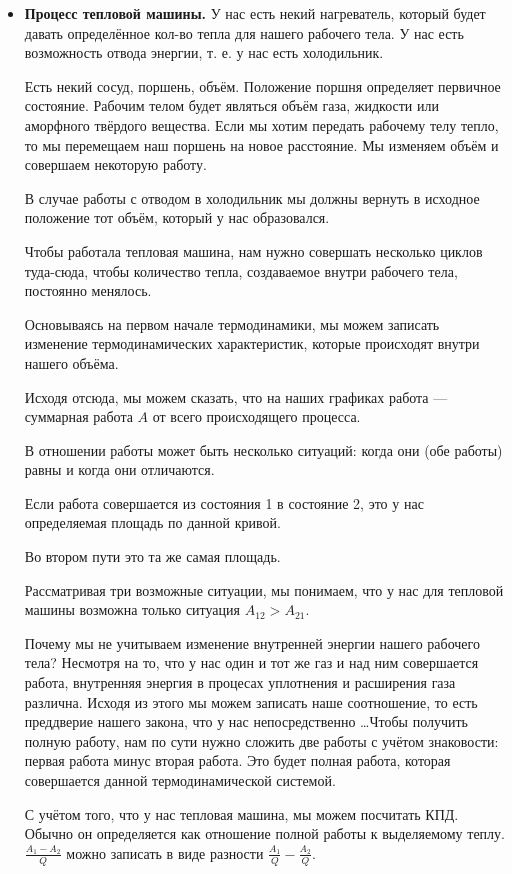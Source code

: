 \documentclass{book}
\begin{document}
\begin{itemize}
    \item {\bf Процесс тепловой машины.} У нас есть некий нагреватель, который будет давать определённое кол-во тепла для нашего рабочего тела. У нас есть возможность отвода энергии, т. е. у нас есть холодильник.

    Есть некий сосуд, поршень, объём. Положение поршня определяет первичное состояние. Рабочим телом будет являться объём газа, жидкости или аморфного твёрдого вещества. Если мы хотим передать рабочему телу тепло, то мы перемещаем наш поршень на новое расстояние. Мы изменяем объём и совершаем некоторую работу.

    В случае работы с отводом в холодильник мы должны вернуть в исходное положение тот объём, который у нас образовался.

    Чтобы работала тепловая машина, нам нужно совершать несколько циклов туда-сюда, чтобы количество тепла, создаваемое внутри рабочего тела, постоянно менялось.

    Основываясь на первом начале термодинамики, мы можем записать изменение термодинамических характеристик, которые происходят внутри нашего объёма.

    Исходя отсюда, мы можем сказать, что на наших графиках работа --- суммарная работа $A$ от всего происходящего процесса.

    В отношении работы может быть несколько ситуаций: когда они (обе работы) равны и когда они отличаются.

    Если работа совершается из состояния 1 в состояние 2, это у нас определяемая площадь по данной кривой.

    Во втором пути это та же самая площадь.

    Рассматривая три возможные ситуации, мы понимаем, что у нас для тепловой машины возможна только ситуация $A_{12} > A_{21}$.

    Почему мы не учитываем изменение внутренней энергии нашего рабочего тела? Несмотря на то, что у нас один и тот же газ и над ним совершается работа, внутренняя энергия в процесах уплотнения и расширения газа различна. Исходя из этого мы можем записать наше соотношение, то есть преддверие нашего закона, что у нас непосредственно \dots Чтобы получить полную работу, нам по сути нужно сложить две работы с учётом знаковости: первая работа минус вторая работа. Это будет полная работа, которая совершается данной термодинамической системой.

    С учётом того, что у нас тепловая машина, мы можем посчитать КПД. Обычно он определяется как отношение полной работы к выделяемому теплу. $\frac{A_1 - A_2}{Q}$ можно записать в виде разности $\frac{A_1}{Q} - \frac{A_2}{Q}$.


\end{itemize}
\end{document}
